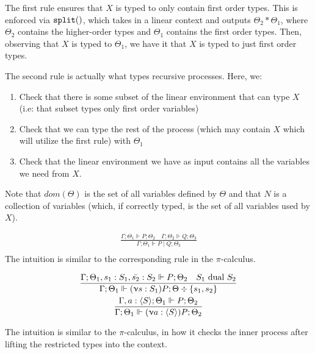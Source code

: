 The first rule ensures that $X$ is typed to only contain first order types. This is enforced via $\splt$, which takes in a linear context and outputs $\Theta_2 * \Theta_1$, where $\Theta_2$ contains the higher-order types and $\Theta_1$ contains the first order types. Then, observing that $X$ is typed to $\Theta_1$, we have it that $X$ is typed to just first order types.

The second rule is actually what types recursive processes. Here, we:
\begin{enumerate}
    \item Check that there is some subset of the linear environment that can type $X$ (i.e: that subset types only first order variables)
    \item Check that we can type the rest of the process (which may contain $X$ which will utilize the first rule) with $\Theta_1$
    \item Check that the linear environment we have as input contains all the variables we need from $X$.
\end{enumerate}

Note that $dom(\Theta)$ is the set of all variables defined by $\Theta$ and that $N$ is a collection of variables (which, if correctly typed, is the set of all variables used by $X$).


\begin{gather*}
\frac{\Gamma ; \Theta_1 \Vdash P ; \Theta_2 \quad \Gamma ; \Theta_2 \Vdash Q ; \Theta_3}{\Gamma ; \Theta_1 \Vdash P \mid Q ; \Theta_3} \\
\end{gather*}
The intuition is similar to the corresponding rule in the $\pi$-calculus.

\begin{gather*}
\frac{\Gamma ; \Theta_1 , s_1 : S_1, \bar{s_2} : S_2 \Vdash P ; \Theta_2 \quad S_1 \text{ dual } S_2}{\Gamma ; \Theta_1 \Vdash (\upnu s : S_1)P ; \Theta \div \{s_1, s_2\}} \\
\frac{\Gamma, a : \langle S \rangle ; \Theta_1 \Vdash P ; \Theta_2}{\Gamma ; \Theta_1 \Vdash (\upnu a : \langle S \rangle)P ; \Theta_2} \\
\end{gather*}

The intuition is similar to the $\pi$-calculus, in how it checks the inner process after lifting the restricted types into the context.


